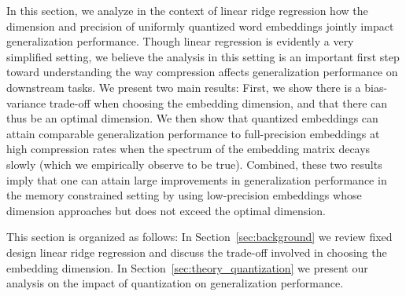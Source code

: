 In this section, we analyze in the context of linear ridge regression how the dimension and precision of uniformly quantized word embeddings jointly impact generalization performance.
Though linear regression is evidently a very simplified setting, we believe the analysis in this setting is an important first step toward understanding the way compression affects generalization performance on downstream tasks.
We present two main results:
First, we show there is a bias-variance trade-off when choosing the embedding dimension, and that there can thus be an optimal dimension.
We then show that quantized embeddings can attain comparable generalization performance to full-precision embeddings at high compression rates when the spectrum of the embedding matrix decays slowly (which we empirically observe to be true).
Combined, these two results imply that one can attain large improvements in generalization performance in the memory constrained setting by using low-precision embeddings whose dimension approaches but does not exceed the optimal dimension.


This section is organized as follows:
In Section~\ref{sec:background} we review fixed design linear ridge regression and discuss the trade-off involved in choosing the embedding dimension.
In Section~\ref{sec:theory_quantization} we present our analysis on the impact of quantization on generalization performance.


